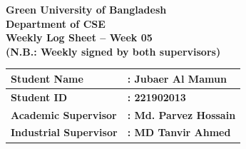 \documentclass[a4paper,11pt]{article}
\begin{document}
\newpage

\begin{center}
    {\Large \textbf{Green University of Bangladesh}} \\[0.5em]
    {\large \textbf{Department of CSE}} \\[0.5em]
    {\large \textbf{Weekly Log Sheet -- Week 05}} \\[0.5em]
    {\color{red} \textbf{(N.B.: Weekly signed by both supervisors)}}
\end{center}

\vspace{1em}

\begin{tabularx}{\textwidth}{|l|X|}
\hline
\textbf{Student Name} & \textbf{: Jubaer Al Mamun} \\ \hline
\textbf{Student ID} & \textbf{: 221902013} \\ \hline
\textbf{Academic Supervisor} & \textbf{: Md. Parvez Hossain} \\ \hline
\textbf{Industrial Supervisor} & \textbf{: MD Tanvir Ahmed} \\ \hline
\end{tabularx}

\vspace{1em}
\end{document}
